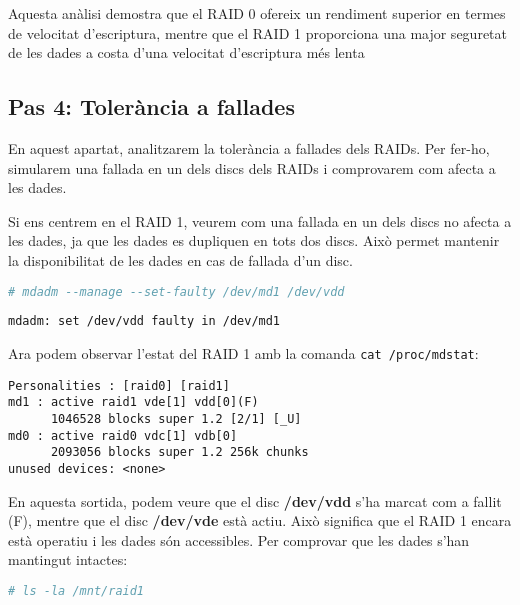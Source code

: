 Aquesta anàlisi demostra que el RAID 0 ofereix un rendiment superior en termes de velocitat d'escriptura, mentre que el RAID 1 proporciona una major seguretat de les dades a costa d'una velocitat d'escriptura més lenta


\subsection{Pas 4: Tolerància a fallades}\label{pas-4-tolerància-a-fallades}

En aquest apartat, analitzarem la tolerància a fallades dels RAIDs. Per fer-ho, simularem una fallada en un dels discs dels RAIDs i comprovarem com afecta a les dades. 

Si ens centrem en el RAID 1, veurem com una fallada en un dels discs no afecta a les dades, ja que les dades es dupliquen en tots dos discs. Això permet mantenir la disponibilitat de les dades en cas de fallada d'un disc.

\begin{lstlisting}[language=bash, numbers=none, commentstyle=\color{black}]
# mdadm --manage --set-faulty /dev/md1 /dev/vdd
\end{lstlisting}

\begin{terminaloutput}
\footnotesize\begin{verbatim}
mdadm: set /dev/vdd faulty in /dev/md1
\end{verbatim}
\end{terminaloutput}

Ara podem observar l'estat del RAID 1 amb la comanda \texttt{cat /proc/mdstat}:

\begin{terminaloutput}
\footnotesize\begin{verbatim}
Personalities : [raid0] [raid1]
md1 : active raid1 vde[1] vdd[0](F)
      1046528 blocks super 1.2 [2/1] [_U]
md0 : active raid0 vdc[1] vdb[0]
      2093056 blocks super 1.2 256k chunks  
unused devices: <none>
\end{verbatim}
\end{terminaloutput}

En aquesta sortida, podem veure que el disc \textbf{/dev/vdd} s'ha marcat com a fallit (F), mentre que el disc \textbf{/dev/vde} està actiu. Això significa que el RAID 1 encara està operatiu i les dades són accessibles. Per comprovar que les dades s'han mantingut intactes:

\begin{lstlisting}[language=bash, numbers=none, commentstyle=\color{black}]
# ls -la /mnt/raid1
\end{lstlisting}

